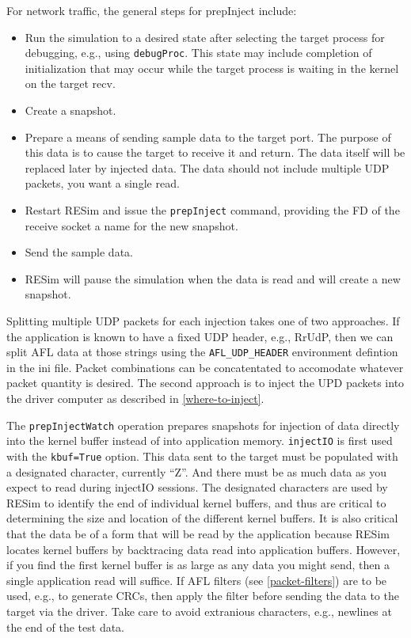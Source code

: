 \documentclass[titlepage]{article}
\begin{document}
For network traffic, the general steps for prepInject include:
\begin{itemize}
\item Run the simulation to a desired state after selecting the target process for debugging, e.g., using {\tt debugProc}.  This state may include
completion of initialization that may occur while the target process is waiting in the kernel on the target recv.
\item Create a snapshot.
\item Prepare a means of sending sample data to the target port.  The purpose of this data is to cause the target to receive it and return.  The
data itself will be replaced later by injected data.  The data should not include multiple UDP packets, you want a single read.
\item Restart RESim and issue the {\tt prepInject} command, providing the FD of the receive socket a name for the new snapshot.
\item Send the sample data.
\item RESim will pause the simulation when the data is read and will create a new snapshot.
\end{itemize}

Splitting multiple UDP packets for each injection takes one of two approaches.  If the application is known
to have a fixed UDP header, e.g., RrUdP, then we can split AFL data at those strings using the {\tt AFL\_UDP\_HEADER} environment
defintion in the ini file.  Packet combinations can be concatentated
to accomodate whatever packet quantity is desired.  The second approach is to inject the UPD packets
into the driver computer as described in  \ref{where-to-inject}.

The {\tt prepInjectWatch} operation prepares snapshots for injection of data directly into the kernel buffer instead of into application memory.  
{\tt injectIO} is first used with the {\tt kbuf=True} option.
This data sent to the target must be populated with 
a designated character, currently ``Z''.  And there must be as much data as you expect to read during injectIO sessions.  The designated characters are used by
RESim to identify the end of individual kernel buffers, and thus are critical to determining the size and location of the different kernel buffers.  It is also
critical that the data be of a form that will be read by the application because RESim locates kernel buffers by backtracing data read into application buffers.
However, if you find the first kernel buffer is as large as any data you might send, then a single application read will suffice.
If AFL filters (see \ref{packet-filters}) are to be used, e.g., to generate CRCs, then apply the filter before sending the data to the target via the driver.
Take care to avoid extranious characters, e.g., newlines at the end of the test data.
\end{document}
